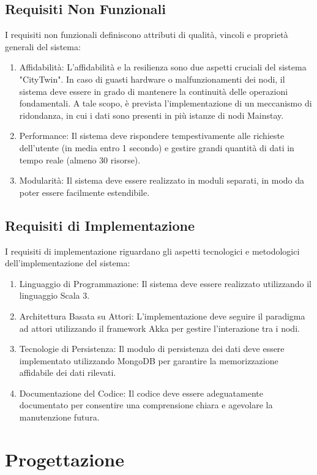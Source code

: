 \documentclass{scrartcl}
\begin{document}
\subsection{Requisiti Non Funzionali}
I requisiti non funzionali definiscono attributi di qualità, vincoli e proprietà generali del sistema:
\begin{enumerate}
    \item Affidabilità: L'affidabilità e la resilienza sono due aspetti cruciali del sistema "CityTwin". In caso di guasti hardware o malfunzionamenti dei nodi, il sistema deve essere in grado di mantenere la continuità delle operazioni fondamentali. A tale scopo, è prevista l'implementazione di un meccanismo di ridondanza, in cui i dati sono presenti in più istanze di nodi Mainstay.
    \item Performance: Il sistema deve rispondere tempestivamente alle richieste dell'utente (in media entro 1 secondo) e gestire grandi quantità di dati in tempo reale (almeno 30 risorse).
    \item Modularità: Il sistema deve essere realizzato in moduli separati, in modo da poter essere facilmente estendibile.
\end{enumerate}

\subsection{Requisiti di Implementazione}
I requisiti di implementazione riguardano gli aspetti tecnologici e metodologici dell'implementazione del sistema:
\begin{enumerate}
    \item Linguaggio di Programmazione: Il sistema deve essere realizzato utilizzando il linguaggio Scala 3\cite{scala}.
    \item Architettura Basata su Attori: L'implementazione deve seguire il paradigma ad attori utilizzando il framework Akka\cite{akka} per gestire l'interazione tra i nodi.
    \item Tecnologie di Persistenza: Il modulo di persistenza dei dati deve essere implementato utilizzando MongoDB\cite{mongodb} per garantire la memorizzazione affidabile dei dati rilevati.
    \item Documentazione del Codice: Il codice deve essere adeguatamente documentato per consentire una comprensione chiara e agevolare la manutenzione futura.
\end{enumerate}

\section{Progettazione}
\end{document}
